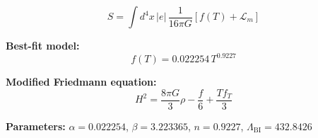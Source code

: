 
\begin{equation}
  S = \int d^4x \, |e| \, \frac{1}{16\pi G} \left[ f(T) + \mathcal{L}_m \right]
\end{equation}

\textbf{Best-fit model:}
\begin{equation}
  f(T) = 0.022254 \, T^{0.9227}
\end{equation}

\textbf{Modified Friedmann equation:}
\begin{equation}
  H^2 = \frac{8\pi G}{3} \rho - \frac{f}{6} + \frac{T f_T}{3}
\end{equation}

\textbf{Parameters:}
$\alpha = 0.022254$, \quad
$\beta = 3.223365$, \quad
$n = 0.9227$, \quad
$\Lambda_{\text{BI}} = 432.8426$